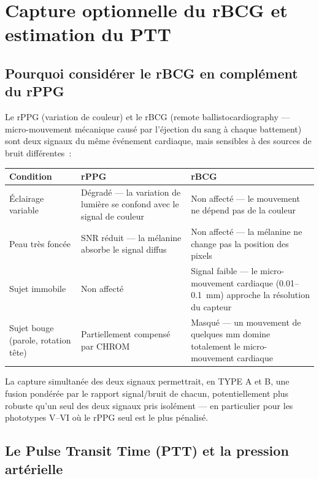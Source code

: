 \documentclass[11pt,a4paper]{article}
\begin{document}
\newpage
\section{Capture optionnelle du rBCG et estimation du PTT}

\subsection{Pourquoi consid\'erer le rBCG en compl\'ement du rPPG}

Le rPPG (variation de couleur) et le rBCG (remote
ballistocardiography --- micro-mouvement m\'ecanique caus\'e par
l'\'ejection du sang \`a chaque battement) sont deux signaux du m\^eme
\'ev\'enement cardiaque, mais sensibles \`a des sources de bruit
diff\'erentes~:

\begin{center}
\begin{tabularx}{\textwidth}{P{4cm} X X}
\toprule
\textbf{Condition} & \textbf{rPPG} & \textbf{rBCG} \\
\midrule
\'Eclairage variable & D\'egrad\'e --- la variation de lumi\`ere se confond
avec le signal de couleur & Non affect\'e --- le mouvement ne d\'epend pas de
la couleur \\
Peau tr\`es fonc\'ee & SNR r\'eduit --- la m\'elanine absorbe le signal
diffus & Non affect\'e --- la m\'elanine ne change pas la position des
pixels \\
Sujet immobile & Non affect\'e & Signal faible --- le micro-mouvement
cardiaque (0.01--0.1~mm) approche la r\'esolution du capteur \\
Sujet bouge (parole, rotation t\^ete) & Partiellement compens\'e par CHROM
& Masqu\'e --- un mouvement de quelques mm domine totalement le
micro-mouvement cardiaque \\
\bottomrule
\end{tabularx}
\end{center}

La capture simultan\'ee des deux signaux permettrait, en TYPE A et B, une
fusion pond\'er\'ee par le rapport signal/bruit de chacun, potentiellement
plus robuste qu'un seul des deux signaux pris isol\'ement --- en particulier
pour les phototypes V--VI o\`u le rPPG seul est le plus pénalis\'e.

\subsection{Le Pulse Transit Time (PTT) et la pression art\'erielle}
\end{document}
